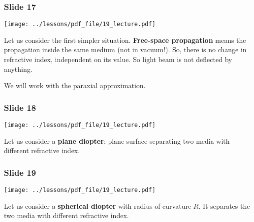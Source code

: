 \documentclass[../main/main.tex]{subfiles}
\begin{document}
\subsubsection*{Slide 17}

\begin{minipage}[]{0.5\linewidth}
\centering
\texttt{[image: ../lessons/pdf\_file/19\_lecture.pdf]}
\end{minipage}
\hspace{0.3cm}\vspace{0.3cm}
\begin{minipage}[c]{0.47\linewidth}

Let us consider the first simpler situation. \textbf{Free-space propagation} means the propagation inside the same medium (not in vacuum!). So, there is no change in refractive index, independent on its value. So light beam is not deflected by anything.

We will work with the paraxial approximation.

\end{minipage}

\subsubsection*{Slide 18}

\begin{minipage}[]{0.5\linewidth}
\centering
\texttt{[image: ../lessons/pdf\_file/19\_lecture.pdf]}
\end{minipage}
\hspace{0.3cm}\vspace{0.3cm}
\begin{minipage}[c]{0.47\linewidth}

Let us consider a \textbf{plane diopter}: plane surface separating two media with different refractive index.

\end{minipage}

\subsubsection*{Slide 19}

\begin{minipage}[]{0.5\linewidth}
\centering
\texttt{[image: ../lessons/pdf\_file/19\_lecture.pdf]}
\end{minipage}
\hspace{0.3cm}\vspace{0.3cm}
\begin{minipage}[c]{0.47\linewidth}

Let us consider a \textbf{spherical diopter} with radius of curvature \( R \). It separates the two media with different refractive index.

\end{minipage}
\end{document}
